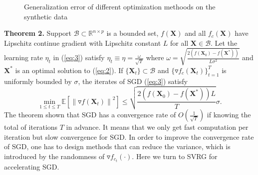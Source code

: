 \documentclass[letterpaper]{article}
\begin{document}
\begin{figure}
{			}
			\caption{Generalization error of different optimization methoods on the synthetic data}
			\label{fig:1} %
		\end{figure}

		\textbf{Theorem 2.} Support $\mathcal{B}\subset\mathbb{R}^{n\times p}$ is a bounded set, $f(\mathbf{X})$ and all $f_c(\mathbf{X})$ have Lipschitz continue gradient with Lipschitz constant $L$ for all $\mathbf{X}\in\mathcal{B}$. Let the learning rate $\eta_t$ in (\ref{eq:3}) satisfy $\eta_t\equiv\eta=\frac{\omega}{\sqrt{T}}$ where $\omega=\sqrt{\frac{2\left(f(\mathbf{X}_0)-f(\mathbf{X}^*)\right)}{L\sigma^2}}$ and $\mathbf{X}^*$ is an optimal solution to (\ref{eq:2}). If $\{\mathbf{X}_t\}\subset\mathcal{B}$ and $\{\triangledown f_c(\mathbf{X}_t)\}^T_{t=1}$ is uniformly bounded by $\sigma$, the iterates of SGD (\ref{eq:3}) satisfy
		$$
		\underset{1\leq t\leq T}{\min}\mathbb{E}\left[\left\|\triangledown f(\mathbf{X}_t)\right\|^2\right]\leq\sqrt{\frac{2(f(\mathbf{X}_0)-f(\mathbf{X}^*))L}{T}}\sigma.
		$$
		The theorem shown that SGD has a convergence rate of $O(\frac{1}{\sqrt{T}})$ if knowing the total of iterations $T$ in advance. It means that we only get fast computation per iteration but slow convergence for SGD. In order to improve the convergence rate of SGD, one has to design methods that can reduce the variance, which is introduced by the randomness of $\triangledown f_{c_t}(\cdot)$. Here we turn to SVRG for accelerating SGD.
\end{document}
